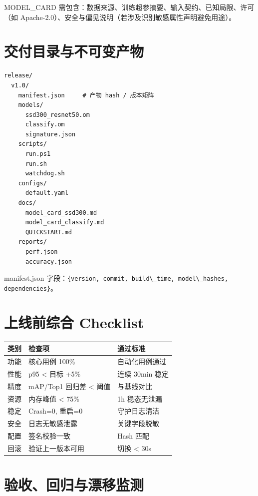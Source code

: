 MODEL\_CARD 需包含：数据来源、训练超参摘要、输入契约、已知局限、许可（如
Apache-2.0）、安全与偏见说明（若涉及识别敏感属性声明避免用途）。

\section{交付目录与不可变产物}\label{src-book-chapter10-h8}

\begin{lstlisting}
release/
  v1.0/
    manifest.json     # 产物 hash / 版本矩阵
    models/
      ssd300_resnet50.om
      classify.om
      signature.json
    scripts/
      run.ps1
      run.sh
      watchdog.sh
    configs/
      default.yaml
    docs/
      model_card_ssd300.md
      model_card_classify.md
      QUICKSTART.md
    reports/
      perf.json
      accuracy.json
\end{lstlisting}

manifest.json
字段：\passthrough{\lstinline!\{version, commit, build\_time, model\_hashes, dependencies\}!}。

\section{上线前综合 Checklist}\label{src-book-chapter10-h9}

\begin{longtable}[]{@{}lll@{}}
\toprule\noalign{}
类别 & 检查项 & 通过标准 \\
\midrule\noalign{}
\endhead
\bottomrule\noalign{}
\endlastfoot
功能 & 核心用例 100\% & 自动化用例通过 \\
性能 & p95 \textless{} 目标 +5\% & 连续 30min 稳定 \\
精度 & mAP/Top1 回归差 \textless{} 阈值 & 与基线对比 \\
资源 & 内存峰值 \textless{} 75\% & 1h 稳态无泄漏 \\
稳定 & Crash=0, 重启=0 & 守护日志清洁 \\
安全 & 日志无敏感泄露 & 关键字段脱敏 \\
配置 & 签名校验一致 & Hash 匹配 \\
回滚 & 验证上一版本可用 & 切换 \textless{} 30s \\
\end{longtable}

\section{验收、回归与漂移监测}\label{src-book-chapter10-h10}

